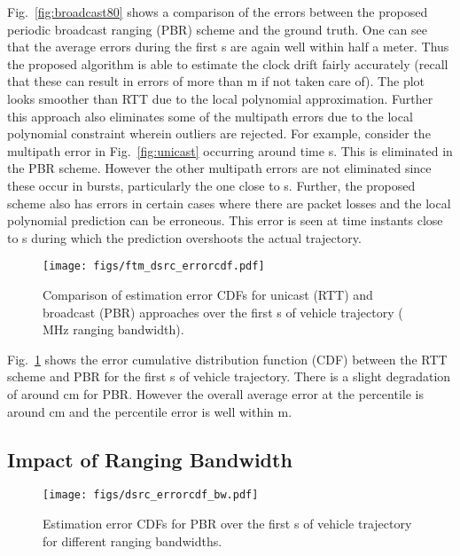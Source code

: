 \documentclass[12pt,journal,final,onecolumn]{IEEEtran}
\theoremstyle{definition}
\theoremstyle{myremark}
\begin{document}
Fig.~\ref{fig:broadcast80} shows a comparison of the errors between the proposed
periodic broadcast ranging (PBR) scheme and the ground truth. One can see that
the average errors during the first  s are again well within half a meter.
Thus the proposed algorithm is able to estimate the clock drift fairly
accurately (recall that these can result in errors of more than  m if not
taken care of). The plot looks smoother than RTT due to the local polynomial
approximation. Further this approach also eliminates some of the multipath
errors due to the local polynomial constraint wherein outliers are rejected. For
example, consider the multipath error in Fig.~\ref{fig:unicast} occurring around
time  s. This is eliminated in the PBR scheme. However the other multipath
errors are not eliminated since these occur in bursts, particularly the one
close to  s.  Further, the proposed scheme also has errors in certain cases
where there are packet losses and the local polynomial prediction can be
erroneous. This error is seen at time instants close to  s during which the
prediction overshoots the actual trajectory.

\begin{figure}[htbp]
    \centering 
    \texttt{[image: figs/ftm\_dsrc\_errorcdf.pdf]} 

    \caption{Comparison of estimation error CDFs for unicast (RTT) and broadcast
        (PBR) approaches over the first  s of vehicle trajectory ( MHz ranging bandwidth).}
    \label{fig:cdf}
\end{figure}

Fig.~\ref{fig:cdf} shows the error cumulative distribution function (CDF)
between the RTT scheme and PBR for the first  s of vehicle trajectory. There
is a slight degradation of around  cm for PBR. However the overall average
error at the  percentile is around  cm and the  percentile error is well
within  m.


\subsection{Impact of Ranging Bandwidth}
\label{sec:experiments_bw}

\begin{figure}[htbp]
    \centering 
    \texttt{[image: figs/dsrc\_errorcdf\_bw.pdf]} 

    \caption{Estimation error CDFs for PBR over the first  s of vehicle
    trajectory for different ranging bandwidths.}
    \label{fig:bandwidth}
\end{figure}
\end{document}
